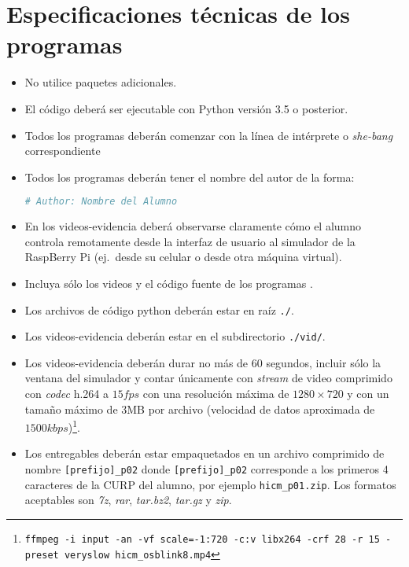 \section{Especificaciones técnicas de los programas}%
\label{sec:programs-specs}
\begin{itemize}[noitemsep]
	\item No utilice paquetes adicionales.
	\item El código deberá ser ejecutable con Python versión 3.5 o posterior.
	\item Todos los programas deberán comenzar con la línea de intérprete o \emph{she-bang} correspondiente
	\item Todos los programas deberán tener el nombre del autor de la forma:

\begin{lstlisting}[language=python]
# Author: Nombre del Alumno
\end{lstlisting}
	\item En los videos-evidencia deberá observarse claramente cómo el alumno controla remotamente desde la interfaz de usuario al simulador de la RaspBerry Pi (ej.~desde su celular o desde otra máquina virtual).

	\item Incluya sólo los videos y el código fuente de los programas .
	\item Los archivos de código python deberán estar en raíz \texttt{./}.
	\item Los videos-evidencia deberán estar en el subdirectorio \texttt{./vid/}.
	\item Los videos-evidencia deberán durar no más de 60 segundos, incluir sólo la ventana del simulador y contar únicamente con \emph{stream} de video comprimido con \emph{codec} h.264 a \(15fps\) con una resolución máxima de \(1280 \times 720\) y con un tamaño máximo de 3MB por archivo (velocidad de datos aproximada de \(1500kbps\))\footnote{\texttt{ffmpeg -i input -an -vf scale=-1:720 -c:v libx264 -crf 28 -r 15 -preset veryslow hicm\_osblink8.mp4}}.
	\item Los entregables deberán estar empaquetados en un archivo comprimido de nombre \texttt{[prefijo]\_p02} donde \texttt{[prefijo]\_p02} corresponde a los primeros 4 caracteres de la CURP del alumno, por ejemplo \texttt{hicm\_p01.zip}.
	Los formatos aceptables son \emph{7z}, \emph{rar}, \emph{tar.bz2}, \emph{tar.gz} y \emph{zip}.
\end{itemize}
